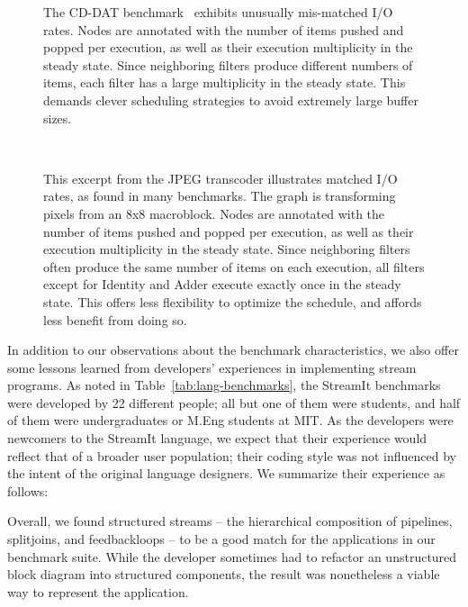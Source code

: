 \begin{figure}[t!]
\centering
{}
\vspace{-6pt}
\caption[CD-DAT, an example of mismatched I/O rates.]{The CD-DAT
  benchmark~\cite{murthy_buffer_2004} exhibits unusually mis-matched
  I/O rates.  Nodes are annotated with the number of items pushed and
  popped per execution, as well as their execution multiplicity in the
  steady state. Since neighboring filters produce different numbers of
  items, each filter has a large multiplicity in the steady state.
  This demands clever scheduling strategies to avoid extremely large
  buffer sizes.\protect\label{fig:cd-dat}}
~ \\
\vspace{-6pt}
\caption[JPEG transcoder excerpt, an example of matched I/O rates.]{This 
excerpt from the JPEG transcoder illustrates matched I/O rates, as
found in many benchmarks.  The graph is transforming pixels from an
8x8 macroblock.  Nodes are annotated with the number of items pushed
and popped per execution, as well as their execution multiplicity in
the steady state.  Since neighboring filters often produce the same
number of items on each execution, all filters except for Identity and
Adder execute exactly once in the steady state.  This offers less
flexibility to optimize the schedule, and affords less benefit from
doing so.
\protect\label{fig:jpeg}}
\vspace{-24pt}
\end{figure}

\myend

In addition to our observations about the benchmark characteristics,
we also offer some lessons learned from developers' experiences in
implementing stream programs.  As noted in
Table~\ref{tab:lang-benchmarks}, the StreamIt benchmarks were
developed by 22 different people; all but one of them were students,
and half of them were undergraduates or M.Eng students at MIT.  As the
developers were newcomers to the StreamIt language, we expect that
their experience would reflect that of a broader user population;
their coding style was not influenced by the intent of the original
language designers.  We summarize their experience as follows:

\mybegin

  Overall, we found structured streams --
  the hierarchical composition of pipelines, splitjoins, and
  feedbackloops -- to be a good match for the applications in our
  benchmark suite.  While the developer sometimes had to refactor an
  unstructured block diagram into structured components, the result
  was nonetheless a viable way to represent the application.

